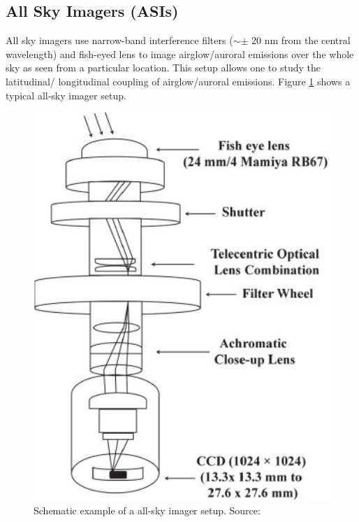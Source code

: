 \documentclass[crop=false,class=mitthesis,oneside,font=12pt]{standalone}
\begin{document}
\subsection{All Sky Imagers (ASIs)}
All sky imagers use narrow-band interference filters ($\sim \pm$ 20 nm from the central wavelength) and fish-eyed lens to image airglow/auroral emissions over the whole sky as seen from a particular location. This setup allows one to study the latitudinal/ longitudinal coupling of airglow/auroral emissions. Figure \ref{fig:asi_s} shows a typical all-sky imager setup. 
\begin{figure}[H]
	\centering\includegraphics[width=30pc]{asi.jpg}
	\caption{Schematic example of a all-sky imager setup. Source: \cite{nade2012occurrence}}
	\label{fig:asi_s}
\end{figure}
\end{document}
